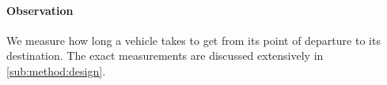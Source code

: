 

\paragraph{Observation} 
We measure how long a vehicle takes to get from its point of departure to its destination. The exact measurements are discussed extensively in \cref{sub:method:design}.


